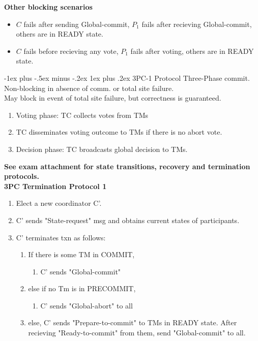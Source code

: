 \documentclass[8pt, landscape]{extarticle}
\makeatletter
\renewcommand{\subsubsection}{\@startsection{subsubsection}{3}{0mm}%
  {-1ex plus -.5ex minus -.2ex}%
  {1ex plus .2ex}%
{\normalfont\small\bfseries}}%
\makeatother
\begin{document}
\begin{multicols*}{4}
\textbf{Other blocking scenarios}
\begin{itemize}
    \item $C$ fails after sending Global-commit, $P_1$ fails after recieving Global-commit, others are in READY state.
    \item $C$ fails before recieving any vote, $P_1$ fails after voting, others are in READY state.
\end{itemize}

\subsubsection{3PC-1 Protocol}
Three-Phase commit. Non-blocking in absence of comm. or total site failure. \\
May block in event of total site failure, but correctness is guaranteed.
\begin{enumerate}
    \item Voting phase: TC collects votes from TMs
    \item TC disseminates voting outcome to TMs if there is no abort vote.
    \item Decision phase: TC broadcasts global decision to TMs.
\end{enumerate}

\textbf{See exam attachment for state transitions, recovery and termination protocols.} \\

\textbf{3PC Termination Protocol 1}

\begin{enumerate}
    \item Elect a new coordinator C'.
    \item C' sends "State-request" msg and obtains current states of participants.
    \item C' terminates txn as follows:
    \begin{enumerate}
        \item If there is some TM in COMMIT,
        \begin{enumerate}
            \item C' sends "Global-commit"
        \end{enumerate}
        \item else if no Tm is in PRECOMMIT,
        \begin{enumerate}
            \item C' sends "Global-abort" to all
        \end{enumerate}
        \item else, C' sends "Prepare-to-commit" to TMs in READY state. After recieving "Ready-to-commit" from them, send "Global-commit" to all.
    \end{enumerate}
\end{enumerate}


\end{multicols*}
\end{document}
